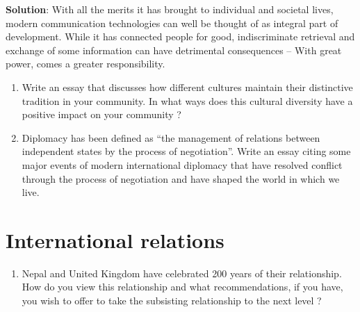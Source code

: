 \documentclass[
]{book}
\providecommand{\tightlist}{%
  \setlength{\itemsep}{0pt}\setlength{\parskip}{0pt}}
\newenvironment{solution}{ {\bfseries Solution}:}{}
\begin{document}
\begin{solution}
With all the merits it has brought to individual and societal lives, modern communication technologies can well be thought of as integral part of development. While it has connected people for good, indiscriminate retrieval and exchange of some information can have detrimental consequences -- With great power, comes a greater responsibility.

\end{solution}

\begin{enumerate}
\def\labelenumi{\arabic{enumi}.}
\setcounter{enumi}{1}
\item
  Write an essay that discusses how different cultures maintain their distinctive tradition in your community. In what ways does this cultural diversity have a positive impact on your community ?
\item
  Diplomacy has been defined as ``the management of relations between independent states by the process of negotiation''. Write an essay citing some major events of modern international diplomacy that have resolved conflict through the process of negotiation and have shaped the world in which we live.
\end{enumerate}

\hypertarget{international-relations}{%
\section{International relations}\label{international-relations}}

\begin{enumerate}
\def\labelenumi{\arabic{enumi}.}
\tightlist
\item
  Nepal and United Kingdom have celebrated 200 years of their relationship. How do you view this relationship and what recommendations, if you have, you wish to offer to take the subsisting relationship to the next level ?
\end{enumerate}
\end{document}
